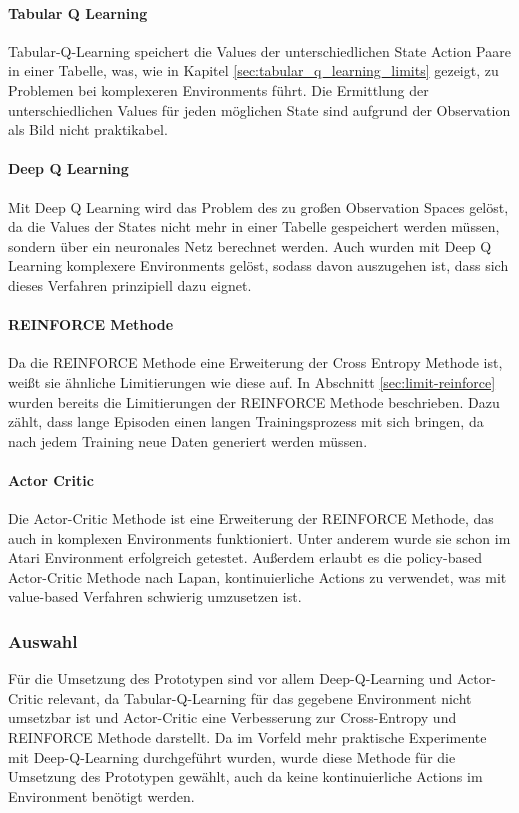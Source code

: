 \documentclass[11pt]{scrartcl}
\begin{document}
\paragraph{Tabular Q Learning}
Tabular-Q-Learning speichert die Values der unterschiedlichen State Action Paare in einer
Tabelle, was, wie in Kapitel \ref{sec:tabular_q_learning_limits} gezeigt, zu Problemen bei
komplexeren Environments führt. Die Ermittlung der unterschiedlichen Values für jeden
möglichen State sind aufgrund der Observation als Bild nicht praktikabel.

\paragraph{Deep Q Learning}
Mit Deep Q Learning wird das Problem des zu großen Observation Spaces gelöst, da die
Values der States nicht mehr in einer Tabelle gespeichert werden müssen, sondern über ein
neuronales Netz berechnet werden. Auch wurden mit Deep Q Learning komplexere Environments
gelöst, sodass davon auszugehen ist, dass sich dieses Verfahren prinzipiell dazu eignet.

\paragraph{REINFORCE Methode}
Da die REINFORCE Methode eine Erweiterung der Cross Entropy Methode ist, weißt sie
ähnliche Limitierungen wie diese auf. In Abschnitt \ref{sec:limit-reinforce} wurden
bereits die Limitierungen der REINFORCE Methode beschrieben. Dazu zählt, dass lange
Episoden einen langen Trainingsprozess mit sich bringen, da nach jedem Training neue Daten
generiert werden müssen.

\paragraph{Actor Critic}
Die Actor-Critic Methode ist eine Erweiterung der REINFORCE Methode, das auch in komplexen
Environments funktioniert. Unter anderem wurde sie schon im Atari Environment erfolgreich
getestet. Außerdem erlaubt es die policy-based Actor-Critic Methode nach Lapan,
kontinuierliche Actions zu verwendet, was \cite[~S.346]{L2018} mit value-based Verfahren
schwierig umzusetzen ist.

\subsubsection{Auswahl}
Für die Umsetzung des Prototypen sind vor allem Deep-Q-Learning und Actor-Critic relevant,
da Tabular-Q-Learning für das gegebene Environment nicht umsetzbar ist und Actor-Critic
eine Verbesserung zur Cross-Entropy und REINFORCE Methode darstellt. Da im Vorfeld mehr
praktische Experimente mit Deep-Q-Learning durchgeführt wurden, wurde diese Methode für
die Umsetzung des Prototypen gewählt, auch da keine kontinuierliche Actions im Environment
benötigt werden.
\end{document}
